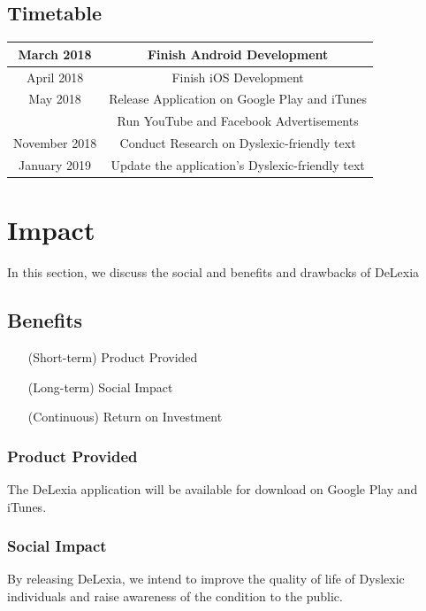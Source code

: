 \documentclass[a4paper]{article}
\begin{document}
\subsection{Timetable}
\begin{center}
\begin{tabular}{ |c|c| } 
 \hline
 
	March 2018 & Finish Android Development\\
     \hline
	April 2018 & Finish iOS Development\\
     \hline
 	May 2018 & Release Application on Google Play and iTunes \\   
    & Run YouTube and Facebook Advertisements\\
     \hline
    November 2018 & Conduct Research on Dyslexic-friendly text\\
     \hline
	January 2019 & Update the application's Dyslexic-friendly text\\
 \hline
\end{tabular}
\end{center}


\section{Impact}
In this section, we discuss the social and benefits and drawbacks of DeLexia  

\subsection{Benefits}

\begin{itemize}
  \setlength{\itemindent}{7em}
   \item[(Short-term)] Product Provided
   \item [(Long-term)] Social Impact
   \item [(Continuous)] Return on Investment
\end{itemize}


\subsubsection{Product Provided}
The DeLexia application will be available for download on Google Play and iTunes.

\subsubsection{Social Impact}
By releasing DeLexia, we intend to improve the quality of life of Dyslexic individuals and raise awareness of the condition to the public.
\end{document}

